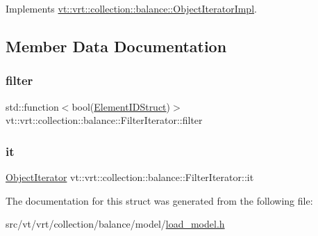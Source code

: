 Implements \hyperlink{structvt_1_1vrt_1_1collection_1_1balance_1_1_object_iterator_impl_ab59b65c6a22626b6d2d3ab283309ac1f}{vt\+::vrt\+::collection\+::balance\+::\+Object\+Iterator\+Impl}.



\subsection{Member Data Documentation}
\mbox{\label{structvt_1_1vrt_1_1collection_1_1balance_1_1_filter_iterator_a89d9841e7176310ab6c712643f88ead7}} 
\subsubsection{\texorpdfstring{filter}{filter}}
{\footnotesize\ttfamily std\+::function$<$bool(\hyperlink{namespacevt_1_1vrt_1_1collection_1_1balance_a9f5b53fafb270212279a4757d2c4cd28}{Element\+I\+D\+Struct})$>$ vt\+::vrt\+::collection\+::balance\+::\+Filter\+Iterator\+::filter}

\mbox{\label{structvt_1_1vrt_1_1collection_1_1balance_1_1_filter_iterator_a908bc73f57f49c2f615119ac87b253a8}} 
\subsubsection{\texorpdfstring{it}{it}}
{\footnotesize\ttfamily \hyperlink{structvt_1_1vrt_1_1collection_1_1balance_1_1_object_iterator}{Object\+Iterator} vt\+::vrt\+::collection\+::balance\+::\+Filter\+Iterator\+::it}



The documentation for this struct was generated from the following file\+:\begin{DoxyCompactItemize}
\item 
src/vt/vrt/collection/balance/model/\hyperlink{load__model_8h}{load\+\_\+model.\+h}\end{DoxyCompactItemize}
